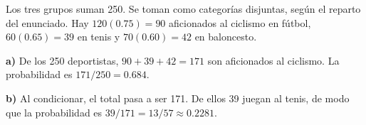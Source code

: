 Los tres grupos suman 250. Se toman como categorías disjuntas,
según el reparto del enunciado. Hay $120(0.75)=90$ aficionados
al ciclismo en fútbol, $60(0.65)=39$ en tenis y $70(0.60)=42$
en baloncesto.

\textbf{a)} De los 250 deportistas, $90+39+42=171$ son aficionados
al ciclismo. La probabilidad es $\boxed{171/250=0.684}$.

\textbf{b)} Al condicionar, el total pasa a ser 171. De ellos 39
juegan al tenis, de modo que la probabilidad es
$\boxed{39/171=13/57\approx0.2281}$.
